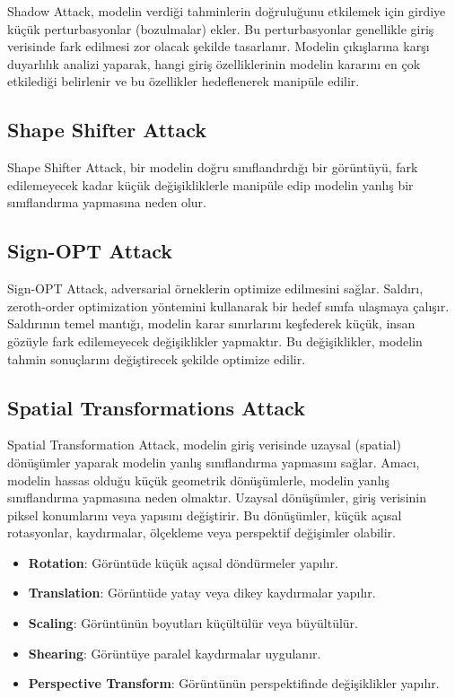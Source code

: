 Shadow Attack, modelin verdiği tahminlerin doğruluğunu etkilemek için girdiye küçük perturbasyonlar (bozulmalar) ekler. Bu perturbasyonlar genellikle giriş verisinde fark edilmesi zor olacak şekilde tasarlanır. Modelin çıkışlarına karşı duyarlılık analizi yaparak, hangi giriş özelliklerinin modelin kararını en çok etkilediği belirlenir ve bu özellikler hedeflenerek manipüle edilir.

\newpage

\subsection{Shape Shifter Attack}

Shape Shifter Attack, bir modelin doğru sınıflandırdığı bir görüntüyü, fark edilemeyecek kadar küçük değişikliklerle manipüle edip modelin yanlış bir sınıflandırma yapmasına neden olur.

\newpage

\subsection{Sign-OPT Attack}

Sign-OPT Attack, adversarial örneklerin optimize edilmesini sağlar. Saldırı, zeroth-order optimization yöntemini kullanarak bir hedef sınıfa ulaşmaya çalışır. Saldırının temel mantığı, modelin karar sınırlarını keşfederek küçük, insan gözüyle fark edilemeyecek değişiklikler yapmaktır. Bu değişiklikler, modelin tahmin sonuçlarını değiştirecek şekilde optimize edilir.

\newpage

\subsection{Spatial Transformations Attack}

Spatial Transformation Attack, modelin giriş verisinde uzaysal (spatial) dönüşümler yaparak modelin yanlış sınıflandırma yapmasını sağlar. Amacı, modelin hassas olduğu küçük geometrik dönüşümlerle, modelin yanlış sınıflandırma yapmasına neden olmaktır. Uzaysal dönüşümler, giriş verisinin piksel konumlarını veya yapısını değiştirir. Bu dönüşümler, küçük açısal rotasyonlar, kaydırmalar, ölçekleme veya perspektif değişimler olabilir.

\begin{itemize}
    \item \textbf{Rotation}: Görüntüde küçük açısal döndürmeler yapılır.
    \item \textbf{Translation}: Görüntüde yatay veya dikey kaydırmalar yapılır.
    \item \textbf{Scaling}: Görüntünün boyutları küçültülür veya büyültülür.
    \item \textbf{Shearing}: Görüntüye paralel kaydırmalar uygulanır.
    \item \textbf{Perspective Transform}: Görüntünün perspektifinde değişiklikler yapılır.
\end{itemize}

